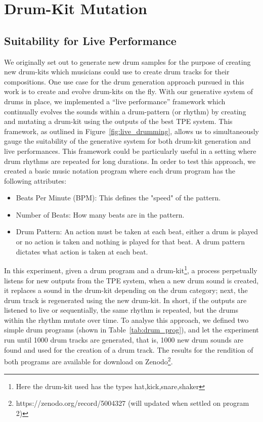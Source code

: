 \documentclass[\main/thesis.tex]{subfiles}
\begin{document}
\chapter{Drum-Kit Mutation}
\section{Suitability for Live Performance}
We originally set out to generate new drum samples for the purpose of creating new drum-kits which musicians could use to create drum tracks for their compositions. One use case for the drum generation approach pursued in this work is to create and evolve drum-kits on the fly. With our generative system of drums in place, we implemented a \enquote{live performance} framework which continually evolves the sounds within a drum-pattern (or rhythm) by creating and mutating a drum-kit using the outputs of the best TPE system. This framework, as outlined in Figure~\ref{fig:live_drumming}, allows us to simultaneously gauge the suitability of the generative system for both drum-kit generation and live performances. This framework could be particularly useful in a setting where drum rhythms are repeated for long durations. In order to test this approach, we created a basic music notation program where each drum program has the following attributes:

\begin{itemize}
    \item Beats Per Minute (BPM): This defines the "speed" of the pattern. 
    \item Number of Beats: How many beats are in the pattern.
    \item Drum Pattern: An action must be taken at each beat, either a drum is played or no action is taken and nothing is played for that beat. A drum pattern dictates what action is taken at each beat.
\end{itemize}

In this experiment, given a drum program and a drum-kit\footnote{Here the drum-kit used has the types hat,kick,snare,shaker}, a process perpetually listens for new outputs from the TPE system, when a new drum sound is created, it replaces a sound in the drum-kit depending on the drum category; next, the drum track is regenerated using the new drum-kit. In short, if the outputs are listened to live or sequentially, the same rhythm is repeated, but the drums within the rhythm mutate over time. To analyse this approach, we defined two simple drum programs (shown in Table~\ref{tab:drum_prog}), and let the experiment run until 1000 drum tracks are generated, that is, 1000 new drum sounds are found and used for the creation of a drum track. The results for the rendition of both programs are available for download on Zenodo\footnote{https://zenodo.org/record/5004327  (will updated when settled on program 2)}. 
\end{document}
